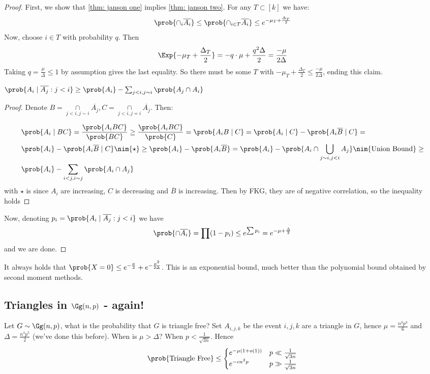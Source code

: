 \documentclass[a4paper, 11pt, oneside]{book}
\begin{document}
\begin{proof}
	First, we show that \ref{thm: janson one} implies \ref{thm: janson two}. For any $T\subset [k]$ we have:
	\[
		\prob{\cap_i\overline{A_i}}\le \prob{\cap_{i\in T}\overline{A_i}} \le e^{-\mu_T+\frac{\Delta_T}{2}}
	\]
	Now, choose $i\in T$ with probability $q$. Then 
	\[
		\Exp{-\mu_T + \frac{\Delta_T}{2}} = -q\cdot \mu + \frac{q^2\Delta}{2} = \frac{-\mu}{2\Delta}
	\]
	Taking $q = \frac{\mu}{\Delta} \le 1$ by assumption gives the last equality. So there must be some $T$ with $-\mu_T+\frac{\Delta_T}{2}\le \frac{-\mu}{2\Delta}$, ending this claim.
	\begin{lemma}
		$\prob{A_i\mid \overline{A_j}: j<i} \ge \prob{A_i} - \sum_{j<i, j\sim i} \prob{A_j\cap A_i}$
	\end{lemma}
	\begin{proof}
		Denote $B = \underset{j<i,j\sim i}{\cap}\overline{A_j}, C =\underset{j<i,j\not\sim i}{\cap}\overline{A_j}$. Then:
		
	\begin{align*}
		&\prob{A_i\mid BC} = \frac{\prob{A_iBC}}{\prob{BC}}\ge \frac{\prob{A_iBC}}{\prob{C}} = \prob{A_iB\mid C} = \prob{A_i\mid C} - \prob{A_i\overline{B}\mid C} = \\
		& \prob{A_i} - \prob{A_i\overline{B}\mid C}\nim{\star} \ge \prob{A_i} - \prob{A_i\overline{B}} = \prob{A_i} - \prob{A_i\cap \bigcup_{j\sim i, j<i}A_j} \nim{\text{Union Bound}}\ge \\
		& \prob{A_i} - \sum_{i<j,i\sim j}\prob{A_i\cap A_j}
	\end{align*}
	with $\star$ is since $A_i$ are increasing, $C$ is decreasing and $\overline{B}$ is increasing. Then by FKG, they are of negative correlation, so the inequality holds
	\end{proof}
	Now, denoting $p_i = \prob{A_i\mid \overline{A_j}: j<i}$ we have
		\begin{align*}
		\prob{\cap\overline{A_i}} = \prod(1-p_i) \le e^{\sum p_i} = e^{-\mu + \frac{\Delta}{2}}
	\end{align*}
	and we are done.
\end{proof}
\begin{remark}
	It always holds that $\prob{X = 0} \le e^{-\frac{\mu}{2}} + e^{-\frac{\mu^2}{2\Delta}}$. This is an exponential bound, much better than the polynomial bound obtained by second moment methods.
\end{remark}
\subsection{Triangles in $\Gg(n,p)$ - again!}
Let $G\sim \Gg(n,p)$, what is the probability that $G$ is triangle free? Set $A_{i,j,k}$ be the event $i,j,k$ are a triangle in $G$, hence $\mu = \frac{n^3p^3}{6}$ and $\Delta = \frac{n^4p^5}{2}$ (we've done this before). When is $\mu > \Delta$? When $p < \frac{1}{\sqrt{3n}}$. Hence
\begin{align*}
	\prob{\text{Triangle Free}} \le \begin{cases}
e^{-\mu(1+o(1))} &  p \ll \frac{1}{\sqrt{3n}}\\
e^{-cn^2p} & p \gg \frac{1}{\sqrt{3n}}
 \end{cases}
\end{align*}
\end{document}

